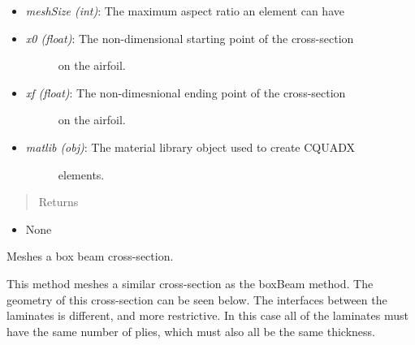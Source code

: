 \documentclass[letterpaper,10pt,english]{sphinxmanual}
\begin{document}
\begin{fulllineitems}
\begin{fulllineitems}
\begin{itemize}
\item {} 
\emph{meshSize (int)}: The maximum aspect ratio an element can have

\item {} \begin{description}
\item[{\emph{x0 (float)}: The non-dimensional starting point of the cross-section}] \leavevmode
on the airfoil.

\end{description}

\item {} \begin{description}
\item[{\emph{xf (float)}: The non-dimesnional ending point of the cross-section}] \leavevmode
on the airfoil.

\end{description}

\item {} \begin{description}
\item[{\emph{matlib (obj)}: The material library object used to create CQUADX}] \leavevmode
elements.

\end{description}

\end{itemize}
\begin{quote}\begin{description}
\item[{Returns}] \leavevmode
\end{description}\end{quote}
\begin{itemize}
\item {} 
None

\end{itemize}

\end{fulllineitems}


\begin{fulllineitems}
\label{structures:AeroComBAT.Structures.Mesher.rectBoxBeam}
Meshes a box beam cross-section.

This method meshes a similar cross-section as the boxBeam method. The
geometry of this cross-section can be seen below. The interfaces
between the laminates is different, and more restrictive. In this case
all of the laminates must have the same number of plies, which must
also all be the same thickness.


\end{fulllineitems}
\end{fulllineitems}
\end{document}
